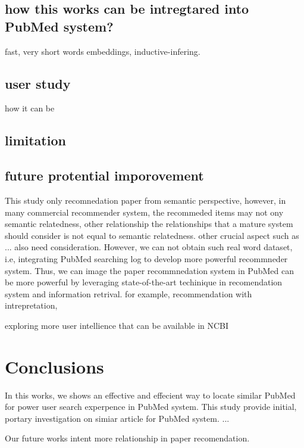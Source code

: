 \documentclass[11pt]{article}
\begin{document}
    \subsection{how this works can be intregtared into PubMed system?}
    fast, very short words embeddings, inductive-infering.

    \subsection{user study}
    how it can be

    \subsection{limitation}

    \subsection{future protential imporovement}

    This study only recomnedation paper from semantic perspective, however, in many commercial recommender system, the recommeded items may not ony semantic relatedness, other relationship
    the relationships that a mature system should consider is not equal to semantic relatedness. other crucial aspect such as ... also need consideration.
    However, we can not obtain such real word dataset, i.e, integrating PubMed searching log to develop more powerful recommneder system.
    Thus, we can image the paper recommnedation system in PubMed can be more powerful by leveraging state-of-the-art techinique in recomendation system and information retrival.
    for example, recommendation with intrepretation,

    exploring more user intellience that can be available in NCBI


    \section{Conclusions}
    In this works, we shows an effective and effecient way to locate similar PubMed for power user search experpence in PubMed system.
    This study provide initial, portary investigation on simiar article for PubMed system.
    ...

    Our future works intent more relationship in paper recomendation.

    
    
\end{document}
